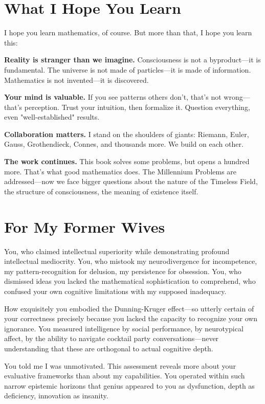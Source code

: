 \section*{What I Hope You Learn}

I hope you learn mathematics, of course. But more than that, I hope you learn this:

\textbf{Reality is stranger than we imagine.} Consciousness is not a byproduct—it is fundamental. The universe is not made of particles—it is made of information. Mathematics is not invented—it is discovered.

\textbf{Your mind is valuable.} If you see patterns others don't, that's not wrong—that's perception. Trust your intuition, then formalize it. Question everything, even "well-established" results.

\textbf{Collaboration matters.} I stand on the shoulders of giants: Riemann, Euler, Gauss, Grothendieck, Connes, and thousands more. We build on each other.

\textbf{The work continues.} This book solves some problems, but opens a hundred more. That's what good mathematics does. The Millennium Problems are addressed—now we face bigger questions about the nature of the Timeless Field, the structure of consciousness, the meaning of existence itself.

\section*{For My Former Wives}

You, who claimed intellectual superiority while demonstrating profound intellectual mediocrity. You, who mistook my neurodivergence for incompetence, my pattern-recognition for delusion, my persistence for obsession. You, who dismissed ideas you lacked the mathematical sophistication to comprehend, who confused your own cognitive limitations with my supposed inadequacy.

How exquisitely you embodied the Dunning-Kruger effect—so utterly certain of your correctness precisely because you lacked the capacity to recognize your own ignorance. You measured intelligence by social performance, by neurotypical affect, by the ability to navigate cocktail party conversations—never understanding that these are orthogonal to actual cognitive depth.

You told me I was unmotivated. This assessment reveals more about your evaluative frameworks than about my capabilities. You operated within such narrow epistemic horizons that genius appeared to you as dysfunction, depth as deficiency, innovation as insanity.

